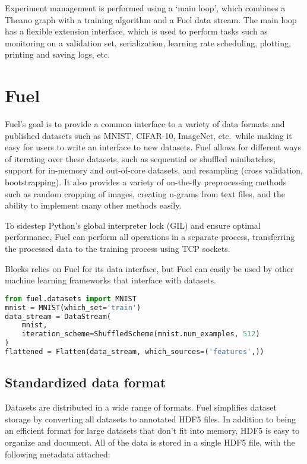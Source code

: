 \documentclass[twoside,11pt]{article}
\begin{document}
Experiment management is performed using a `main loop', which combines a Theano
graph with a training algorithm and a Fuel data stream. The main loop has a
flexible extension interface, which is used to perform tasks such as monitoring
on a validation set, serialization, learning rate scheduling, plotting, printing
and saving logs, etc.

\section{Fuel}

Fuel's goal is to provide a common interface to a variety of data formats and
published datasets such as MNIST, CIFAR-10, ImageNet, etc.\ while making it easy
for users to write an interface to new datasets. Fuel allows for different ways
of iterating over these datasets, such as sequential or shuffled minibatches,
support for in-memory and out-of-core datasets, and resampling (cross
validation, bootstrapping). It also provides a variety of on-the-fly
preprocessing methods such as random cropping of images, creating n-grams from
text files, and the ability to implement many other methods easily.

To sidestep Python's global interpreter lock (GIL) and ensure optimal
performance, Fuel can perform all operations in a separate process,
transferring the processed data to the training process using TCP sockets.

Blocks relies on Fuel for its data interface, but Fuel can easily be used by
other machine learning frameworks that interface with datasets.

\begin{lstlisting}[language=Python,basicstyle=\ttfamily,caption=Iterating over flattened MNIST features in shuffled batches]
from fuel.datasets import MNIST
mnist = MNIST(which_set='train')
data_stream = DataStream(
    mnist,
    iteration_scheme=ShuffledScheme(mnist.num_examples, 512)
)
flattened = Flatten(data_stream, which_sources=('features',))
\end{lstlisting}

\subsection{Standardized data format}

Datasets are distributed in a wide range of formats. Fuel simplifies dataset
storage by converting all datasets to annotated HDF5 files. In addition to being
an efficient format for large datasets that don't fit into memory, HDF5 is easy
to organize and document. All of the data is stored in a single HDF5 file, with
the following metadata attached:
\end{document}
